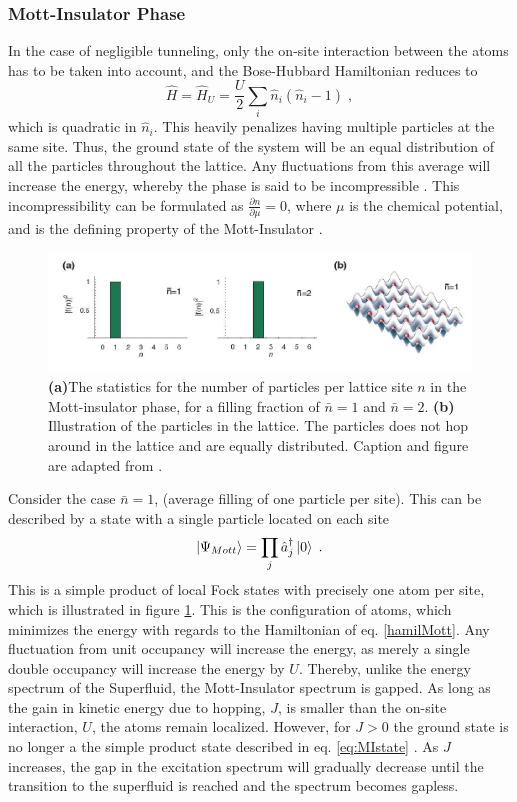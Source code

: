 \subsubsection{Mott-Insulator Phase}
In the case of negligible tunneling, only the on-site interaction between the atoms has to be taken into account, and the Bose-Hubbard Hamiltonian reduces to
\begin{equation}
	\hat{H} = \hat{H}_U = \frac{U}{2} \sum_{i} \hat{n}_i \left( \hat{n}_i -1 \right) \; ,
	\label{hamilMott}
\end{equation}
which is quadratic in $\hat{n}_i$. This heavily penalizes having multiple particles at the same site. Thus, the ground state of the system will be an equal distribution of all the particles throughout the lattice. Any fluctuations from this average will increase the energy, whereby the phase is said to be incompressible \cite{Gemelke2009}. This incompressibility can be formulated as $\frac{\partial n}{\partial \mu} = 0$, where $\mu$ is the chemical potential, and is the defining property of the Mott-Insulator \cite{manybodyBloch}.\\
\begin{figure}[!h]
\centering
\includegraphics[width=0.8\columnwidth]{Figures/f(n)_M.JPG} 
\caption{\textbf{(a)}The statistics for the number of particles per lattice site $n$ in the Mott-insulator phase, for a filling fraction of $\bar{n}=1$ and $\bar{n}=2$. \textbf{(b)} Illustration of the particles in the lattice. The particles does not hop around in the lattice and are equally distributed. Caption and figure are adapted from \cite{greiner}.}
\label{fig:f(n)_M} 
\end{figure}
Consider the case $\bar{n} = 1$, (average filling of one particle per site). This can be described by a state with a single particle located on each site \cite{manybodyBloch}
\begin{equation}
	\ket{\Psi_{Mott}} = \prod_j \hat{a}_{j}^{\dag} \ket{0} \; .
	\label{eq:MIstate}
\end{equation}
This is a simple product of local Fock states with precisely
one atom per site, which is illustrated in figure \ref{fig:f(n)_M}. This is the configuration of atoms, which minimizes the energy with regards to the Hamiltonian of eq. \eqref{hamilMott}. Any fluctuation from unit occupancy will increase the energy, as merely a single double occupancy will increase the energy by $U$. Thereby, unlike the energy spectrum of the Superfluid, the Mott-Insulator spectrum is gapped. As long as the gain in kinetic energy due to hopping, $J$, is smaller than the on-site interaction, $U$, the atoms remain localized. However, for $J > 0$ the ground state is no longer a the simple product state described in eq. \eqref{eq:MIstate} \cite{manybodyBloch}. As $J$ increases, the gap in the excitation spectrum will gradually decrease until the transition to the superfluid is reached and the spectrum becomes gapless.\\
